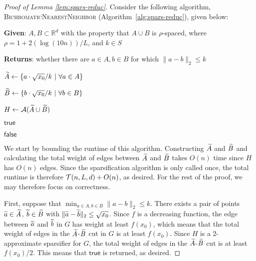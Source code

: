 \begin{proof}[Proof of Lemma \ref{lem:spars-reduc}]

Consider the following algorithm, \textsc{BichromaticNearestNeighbor} (Algorithm~\ref{alg:spars-reduc}), given below:

\begin{algorithm}\caption{}\label{alg:spars-reduc}
\begin{algorithmic}[1]
 

    \State \textbf{Given}: $A,B\subset \mathbb{R}^d$ with the property that $A\cup B$ is $\rho$-spaced, where $\rho = 1 + 2(\log (10 n))/L$, and $k\in S$
    
    \State \textbf{Returns}: whether there are $a\in A, b\in B$ for which $\|a - b\|_2 \le k$
    
    \State $\widetilde{A} \gets \{a \cdot \sqrt{x_0} / k  ~|~ \forall a\in A\}$ 
    
    \State $\widetilde{B} \gets \{b \cdot \sqrt{x_0} / k  ~|~ \forall b\in B\}$ 
    
    \State $H\gets \mathcal A(\widetilde{A} \cup \widetilde{B})$ 
    
        
        \State \Return $\mathsf{true}$
        
    \Else
    
        \State \Return $\mathsf{false}$
        
    \EndIf

\EndProcedure
\end{algorithmic}
\end{algorithm}

We start by bounding the runtime of this algorithm. Constructing $\widetilde{A}$ and $\widetilde{B}$ and calculating the total weight of edges between $\widetilde{A}$ and $\widetilde{B}$ takes $O( n )$ time since $H$ has $O( n )$ edges. Since the sparsification algorithm is only called once, the total runtime is therefore $\mathcal{T}(n, L, d) + O( n )$, as desired. For the rest of the proof, we may therefore focus on correctness.

First, suppose that $\min_{a\in A, b\in B} \|a - b\|_2 \le k$. There exists a pair of points $\widetilde{a} \in \widetilde{A}$, $\widetilde{b} \in \widetilde{B}$ with $\| \widetilde{a} - \widetilde{b} \|_2 \le \sqrt{x_0}$. Since $f$ is a decreasing function, the edge between $\widetilde{a}$ and $\widetilde{b}$ in $G$ has weight at least $f(x_0)$, which means that the total weight of edges in the $\widetilde{A}$-$\widetilde{B}$ cut in $G$ is at least $f(x_0)$. Since $H$ is a 2-approximate sparsifier for $G$, the total weight of edges in the $\widetilde{A}$-$\widetilde{B}$ cut is at least $f(x_0)/2$. This means that $\mathsf{true}$ is returned, as desired.


\end{proof}
